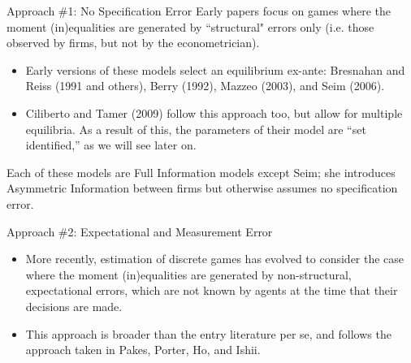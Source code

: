 \documentclass[aspectratio=169,11pt]{beamer}
\begin{document}
\begin{frame}{Approach \#1: No Specification Error}
\vspace{2mm}
Early papers focus on games where the moment (in)equalities are generated by ``structural" errors only (i.e. those observed by firms, but not by the econometrician).  
\begin{itemize}
\item Early versions of these models select an equilibrium ex-ante: Bresnahan and Reiss (1991 and others), Berry (1992), Mazzeo (2003), and Seim (2006).  
\item Ciliberto and Tamer (2009) follow this approach too, but allow for multiple equilibria.  As a result of this, the parameters of their model are ``set identified,'' as we will see later on.
\end{itemize}
Each of these models are Full Information models except Seim; she introduces Asymmetric Information between firms but otherwise assumes no specification error.\\
\end{frame}

\begin{frame}{Approach \#2: Expectational and Measurement Error}
\vspace{2mm}
\begin{itemize}
\item More recently, estimation of discrete games has evolved to consider the case where the moment (in)equalities are generated by non-structural, expectational errors, which are not known by agents at the time that their decisions are made.
\item This approach is broader than the entry literature per se, and follows the approach taken in Pakes, Porter, Ho, and Ishii. 
\end{itemize}
\end{frame}


\end{document}
